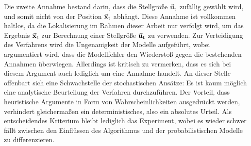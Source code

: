 Die zweite Annahme bestand darin, dass die Stellgröße $\vec{\mathbf{u}}_{\text{t}}$ zufällig gewählt wird, und somit nicht von der Position $\vec{\mathbf{x}}_{\text{t}}$ abhängt. Diese Annahme ist vollkommen haltlos, da die Lokalisierung im Rahmen dieser Arbeit nur verfolgt wird, um das Ergebnis $\vec{\mathbf{x}}_{\text{t}}$ zur Berechnung einer Stellgröße $\vec{\mathbf{u}}_{\text{t}}$ zu verwenden. Zur Verteidigung des Verfahrens wird die Ungenauigkeit der Modelle aufgeführt, wobei argumentiert wird, dass die Modellfehler den Wiederstoß gegen die bestehenden Annahmen überwiegen. Allerdings ist kritisch zu vermerken, dass es sich bei diesem Argument auch lediglich um eine Annahme handelt. An dieser Stelle offenbart sich eine Schwachstelle der stochastischen Ansätze: Es ist kaum möglich eine analytische Beurteilung der Verfahren durchzuführen. Der Vorteil, dass heuristische Argumente in Form von Wahrscheinlichkeiten ausgedrückt werden, verhindert gleichermaßen ein deterministisches, also ein absolutes Urteil. Als entscheidendes Kriterium bleibt lediglich das Experiment, wobei es wieder schwer fällt zwischen den Einflüssen des Algorithmus und der probabilistischen Modelle zu differenzieren.

